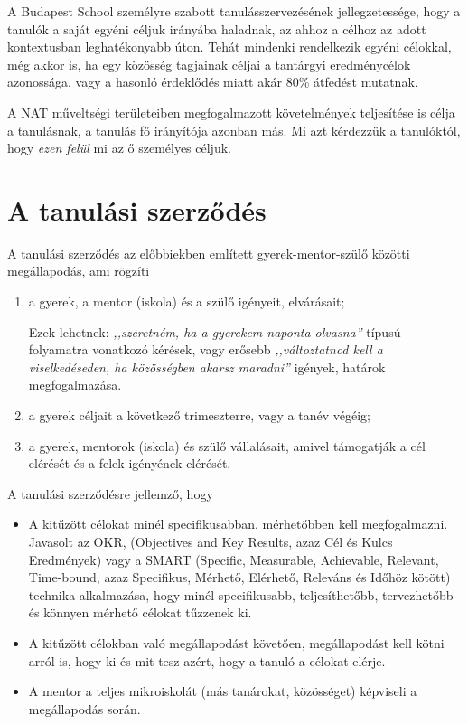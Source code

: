 A Budapest School személyre szabott tanulásszervezésének jellegzetessége, hogy a tanulók a saját egyéni céljuk irányába haladnak, az ahhoz a célhoz az adott kontextusban leghatékonyabb úton. Tehát mindenki rendelkezik egyéni célokkal, még akkor is, ha egy közösség tagjainak céljai a tantárgyi eredménycélok azonossága, vagy a hasonló érdeklődés miatt akár  80\% átfedést mutatnak.

A NAT műveltségi területeiben megfogalmazott követelmények teljesítése is célja a tanulásnak, a tanulás fő irányítója azonban más. Mi azt kérdezzük a tanulóktól, hogy \emph{ezen felül} mi az ő személyes céljuk.

\section{A tanulási szerződés}


A tanulási szerződés az előbbiekben említett gyerek-mentor-szülő közötti megállapodás, ami rögzíti
\begin{enumerate}
\item a gyerek, a mentor (iskola) és a szülő igényeit, elvárásait;

    Ezek lehetnek: \emph{,,szeretném, ha a gyerekem naponta olvasna''} típusú folyamatra vonatkozó kérések, vagy erősebb \emph{,,változtatnod kell a viselkedéseden, ha közösségben akarsz maradni''} igények, határok megfogalmazása.

\item a gyerek céljait a következő trimeszterre, vagy a tanév végéig;

\item a gyerek, mentorok (iskola) és szülő vállalásait, amivel támogatják a cél elérését és a felek igényének elérését.

\end{enumerate}

A tanulási szerződésre jellemző, hogy
\begin{itemize}
\item A kitűzött célokat minél specifikusabban, mérhetőbben kell megfogalmazni. Javasolt az OKR,  (Objectives and Key Results, azaz  Cél és Kulcs Eredmények) \cite{okr} vagy a SMART (Specific, Measurable, Achievable, Relevant, Time-bound, azaz Specifikus,  Mérhető, Elérhető, Releváns és Időhöz kötött) \cite{wiki:smart} technika alkalmazása, hogy minél specifikusabb, teljesíthetőbb, tervezhetőbb és könnyen mérhető célokat tűzzenek ki.

\item A kitűzött célokban való megállapodást követően, megállapodást  kell kötni arról is, hogy ki és mit tesz azért, hogy a tanuló a célokat elérje.

\item A mentor a teljes mikroiskolát (más tanárokat, közösséget) képviseli a megállapodás során.
\end{itemize}


